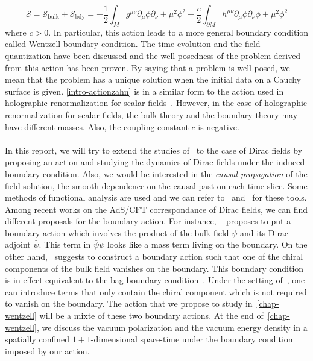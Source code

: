 \begin{equation}\label{intro-actionzahn}
\mathcal{S} = \mathcal{S}_{\mathrm{bulk}} + \mathcal{S}_{\mathrm{bdy}} = 
-\frac 1 2 \int_M g^{\mu\nu} \partial_\mu \phi \partial_{\nu} + 
\mu^2\phi^2 - \frac c 2 \int_{\partial M}h^{\mu\nu}\partial_\mu\phi\partial_\nu\phi + \mu^2\phi^2
\end{equation}
where $c>0$.
In particular, this action leads to  a more general boundary condition called Wentzell boundary condition.
The time evolution and the field quantization have been discussed and the well-posedness of the problem derived from this action has been proven.
By saying that a problem is well posed, we mean that the problem has a unique solution when the initial data on a Cauchy surface is given.
\cref{intro-actionzahn} is in a similar form to the action used in holographic renormalization for scalar fields~\cite{Skenderis2002}. 
However, in the case of holographic renormalization for scalar fields, the bulk theory and the boundary theory may have different masses.
Also, the coupling constant $c$ is negative. \\\\
%
In this report, we will try to extend the studies of~\cite{Zahn2016} to the case of Dirac fields by proposing an action and studying the dynamics of Dirac fields under the induced boundary condition.
Also, we would be interested in the \textit{causal propagation} of the field solution, \ie the smooth dependence on the causal past on each time slice.
Some methods of functional analysis are used and we can refer to~\cite{Reed1981} and~\cite{Reed1975} for these tools. 
%
Among recent works on the AdS/CFT correspondance of Dirac fields, we can find different proposals for the boundary action.
For instance, 
~\cite{Henningson1998} proposes to put a boundary action which involves the product of the bulk field $\psi$ and its Dirac adjoint $\bar{\psi}$. 
This term in $\bar{\psi}\psi$ looks like a mass term living on the boundary.
On the other hand,~\cite{Contino2005} suggests to construct a boundary action such that one of the chiral components of the bulk field vanishes on the boundary.
This boundary condition is in effect equivalent to the bag boundary condition~\cite{Chodos1974}.
Under the setting of~\cite{Contino2005}, one can introduce terms that only contain the chiral component which is not required to vanish on the boundary.
The action that we propose to study in~\cref{chap-wentzell} will be a mixte of these two boundary actions.
At the end of~\cref{chap-wentzell}, we discuss the vacuum polarization and the vacuum energy density in a spatially confined $1+1$-dimensional space-time under the boundary condition imposed by our action.
